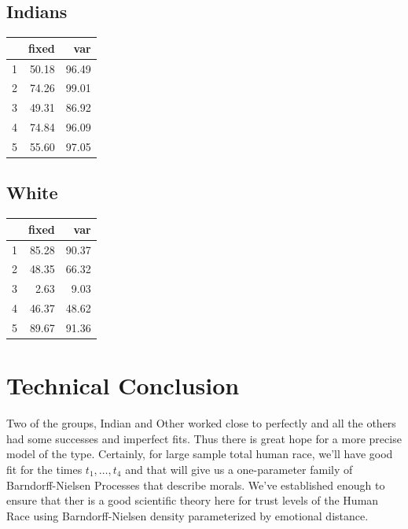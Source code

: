 \documentclass{amsart}
\begin{document}
\subsection{Indians}
\begin{table}[ht]
\centering
\begin{tabular}{rrr}
  \hline
 & fixed & var \\ 
  \hline
1 & 50.18 & 96.49 \\ 
  2 & 74.26 & 99.01 \\ 
  3 & 49.31 & 86.92 \\ 
  4 & 74.84 & 96.09 \\ 
  5 & 55.60 & 97.05 \\ 
   \hline
\end{tabular}
\end{table}

\subsection{White}
\begin{table}[ht]
\centering
\begin{tabular}{rrr}
  \hline
 & fixed & var \\ 
  \hline
1 & 85.28 & 90.37 \\ 
  2 & 48.35 & 66.32 \\ 
  3 & 2.63 & 9.03 \\ 
  4 & 46.37 & 48.62 \\ 
  5 & 89.67 & 91.36 \\ 
   \hline
\end{tabular}
\end{table}

\section{Technical Conclusion}

Two of the groups, Indian and Other worked close to perfectly and all the others had some successes and imperfect fits.   Thus there is great hope for a more precise model of the type.  Certainly, for large sample total human race, we'll have good fit for the times $t_1,\dots,t_4$ and that will give us a one-parameter family of Barndorff-Nielsen Processes that describe morals.  We've established enough to ensure that ther is a good scientific theory here for trust levels of the Human Race using Barndorff-Nielsen density parameterized by emotional distance.
\end{document}
